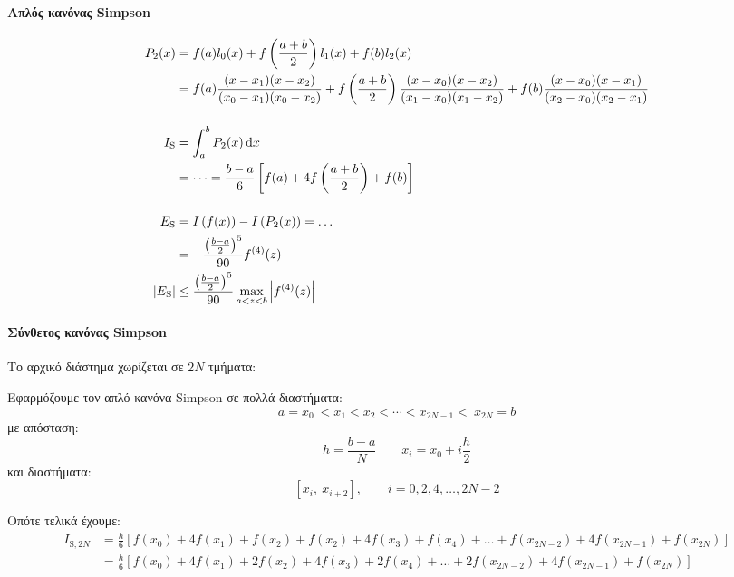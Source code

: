 \documentclass[11pt,a4paper,notitlepage,fleqn,final]{article}
\begin{document}
    \paragraph{Απλός κανόνας Simpson}
    \begin{align*}
    	P_2(x) &= f(a)l_0(x) +f\left(\frac{a+b}{2}\right)l_1(x)+f(b)
    	l_2(x) \\ &= f(a) \frac{(x-x_1)(x-x_2)}{(x_0-x_1)(x_0-x_2)}
    	+ f\left(\frac{a+b}{2}\right)
    	\frac{(x-x_0)(x-x_2)}{(x_1-x_0)(x_1-x_2)}
    	+ f(b) \frac{(x-x_0)(x-x_1)}{(x_2-x_0)(x_2-x_1)}
    	\\[3ex]
    	I_{\mathrm S} &= \int_a^b P_2(x)\mathop{}\!\mathrm{d} x
    	\\ &= \dots = \frac{b-a}{6} \left[
    	f(a)+4f\left(\frac{a+b}{2}\right)+f(b) \right] \\[3ex]
    	E_{\mathrm S} &= I\left(f(x)\right)-I\left(P_2(x)\right) = \dots
    	\\ &= -\frac{\left(\frac{b-a}{2}\right)^5}{90} f^{(4)}(z) \\
    	\left|E_{\mathrm S}\right| &\leq
    	\frac{\left(\frac{b-a}{2}\right)^5}{90}\max_{a<z<b}\left\lvert f^{(4)}(z)\right\rvert
    \end{align*}

    \paragraph{Σύνθετος κανόνας Simpson}
    Το αρχικό διάστημα χωρίζεται σε \( 2N \) τμήματα:


    Εφαρμόζουμε τον απλό κανόνα Simpson σε πολλά διαστήματα:
    \[
    a = x_0 \ < x_1 < x_2 < \cdots < x_{2N-1} < \ x_{2N} = b
    \]
    με απόσταση:
    \[
    h = \frac{b-a}{N} \qquad x_i = x_0 + i\frac{h}{2}
    \]
    και διαστήματα:
    \[
    \left[x_i,\ x_{i+2}\right], \qquad i=0,2,4,\dots,2N-2
    \]

    Οπότε τελικά έχουμε: \begin{align*}
    	I_{\mathrm S,2N} &= \frac{h}{6} \left[f(x_0)+4f(x_1)+f(x_2)
    	+f(x_2)+4f(x_3)+f(x_4)+\dots + f(x_{2N-2}) + 4f(x_{2N-1})
    	+f(x_{2N})\right] \\ &=
    	\frac{h}{6} \left[f(x_0)+4f(x_1)+2f(x_2)+4f(x_3)+2f(x_4)+\dots
    	+ 2f(x_{2N-2}) + 4f(x_{2N-1})+f(x_{2N})\right]
    \end{align*}
\end{document}
